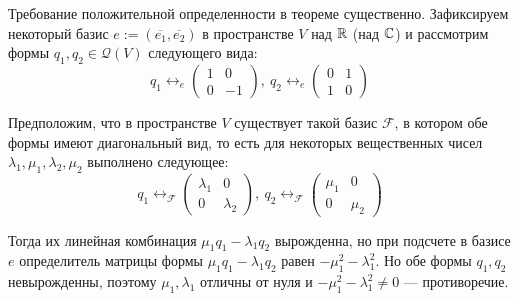 \begin{note}
	Требование положительной определенности в теореме существенно. Зафиксируем некоторый базис $e := (\overline{e_1}, \overline{e_2})$ в пространстве $V$ над $\mathbb{R}$ (над $\mathbb{C}$) и рассмотрим формы $q_1, q_2 \in \mathcal{Q}(V)$ следующего вида:
	\[q_1 \leftrightarrow_e \begin{pmatrix}1&0\\0&-1\end{pmatrix},~q_2 \leftrightarrow_e \begin{pmatrix}0&1\\1&0\end{pmatrix}\]
	
	Предположим, что в пространстве $V$ существует такой базис $\mathcal{F}$, в котором обе формы имеют диагональный вид, то есть для некоторых вещественных чисел $\lambda_1, \mu_1, \lambda_2, \mu_2$ выполнено следующее:
	\[q_1 \leftrightarrow_{\mathcal{F}} \begin{pmatrix}\lambda_1&0\\0&\lambda_2\end{pmatrix},~q_2 \leftrightarrow_{\mathcal{F}} \begin{pmatrix}\mu_1&0\\0&\mu_2\end{pmatrix}\]
	
	Тогда их линейная комбинация $\mu_1q_1 - \lambda_1q_2$ вырожденна, но при подсчете в базисе $e$ определитель матрицы формы $\mu_1q_1 - \lambda_1q_2$ равен $-\mu_1^2 - \lambda_1^2$. Но обе формы $q_1, q_2$ невырожденны, поэтому $\mu_1, \lambda_1$ отличны от нуля и $-\mu_1^2 - \lambda_1^2 \ne 0$ --- противоречие.
\end{note}

